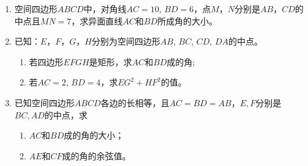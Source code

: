 \begin{enumerate}
\noindent
\begin{minipage}{.55\textwidth}
\begin{enumerate}[(1)]
    \item 若$AC=BD$，求证四边形$EFGH$是菱形；
    \item 若$AC\bot BD$，求证四边形$EFGH$是矩形；
    \item 若$AC=6$，$BD=8$，$AC$和$BD$所成的角是$30^{\circ}$，求四边形$EFGH$的面积。
\end{enumerate}
\end{minipage}
\hfill
\begin{minipage}{.43\textwidth}
\centering
{}
\end{minipage}

\item 空间四边形$ABCD$中，对角线$AC=10$, $BD=6$，点$M$，$N$分别是$AB$，$CD$的中点且$MN=7$，求异面直线$AC$和$BD$所成角的大小。
\item 已知：$E$，$F$，$G$，$H$分别为空间四边形$AB$, $BC$, $CD$, $DA$的中点。
\begin{enumerate}[(1)]
    \item 若四边形$EFGH$是矩形，求$AC$和$BD$成的角;
    \item 若$AC=2$, $BD=4$，求$EG^2+HF^2$的值。
\end{enumerate}

\item 已知空间四边形$ABCD$各边的长相等，且$AC=BD=AB$，$E, F$分别是$BC, AD$的中点，求
\begin{enumerate}[(1)]
\item $AC$和$BD$成的角的大小；
\item $AE$和$CF$成的角的余弦值。
\end{enumerate}



\end{enumerate}
